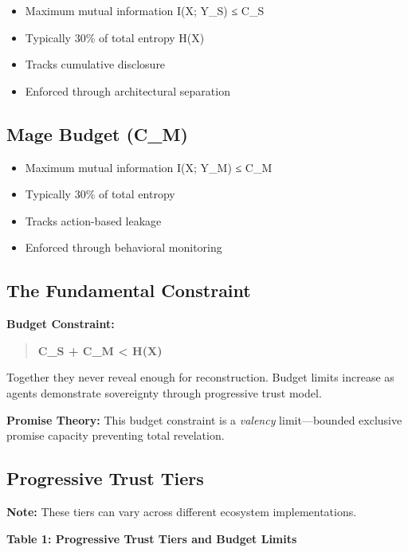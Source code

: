 \documentclass[
]{article}
\begin{document}
\begin{itemize}
\item
  Maximum mutual information I(X; Y\_S) ≤ C\_S
\item
  Typically 30\% of total entropy H(X)
\item
  Tracks cumulative disclosure
\item
  Enforced through architectural separation
\end{itemize}

\subsection{Mage Budget (C\_M)}\label{mage-budget-c_m}

\begin{itemize}
\item
  Maximum mutual information I(X; Y\_M) ≤ C\_M
\item
  Typically 30\% of total entropy
\item
  Tracks action-based leakage
\item
  Enforced through behavioral monitoring
\end{itemize}

\subsection{The Fundamental
Constraint}\label{the-fundamental-constraint}

\textbf{Budget Constraint:}

\begin{quote}
\textbf{C\_S + C\_M \textless{} H(X)}
\end{quote}

Together they never reveal enough for reconstruction. Budget limits
increase as agents demonstrate sovereignty through progressive trust
model.

\textbf{Promise Theory:} This budget constraint is a \emph{valency}
limit---bounded exclusive promise capacity preventing total revelation.

\subsection{Progressive Trust Tiers}\label{progressive-trust-tiers}

\textbf{Note:} These tiers can vary across different ecosystem
implementations.

\textbf{Table 1: Progressive Trust Tiers and Budget Limits}
\end{document}
